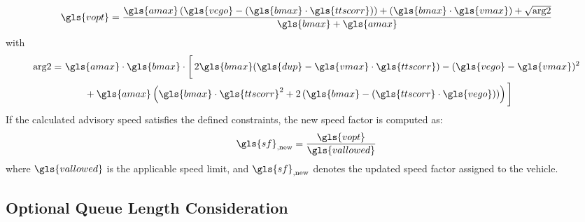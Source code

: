 \begin{equation}
    \gls{vopt} = \frac{\gls{amax} \left(\gls{vego} - (\gls{bmax} \cdot \gls{ttscorr})\right) + (\gls{bmax} \cdot \gls{vmax}) + \sqrt{\text{arg2}}}{\gls{bmax} + \gls{amax}}
\end{equation}
with
\begin{align}
    \text{arg2} =\ & \gls{amax} \cdot \gls{bmax} \cdot \bigg[\,2 \gls{bmax} (\gls{dup} - \gls{vmax} \cdot \gls{ttscorr}) - (\gls{vego} - \gls{vmax})^2 \notag \\
    & \qquad + \gls{amax} \left(\gls{bmax} \cdot \gls{ttscorr}^2 + 2 \left(\gls{bmax} - (\gls{ttscorr} \cdot \gls{vego})\right)\right) \bigg]
\end{align}
If the calculated advisory speed satisfies the defined constraints, the new speed factor is computed as:
\begin{equation}
    \gls{sf}_{\text{,new}} = \frac{\gls{vopt}}{\gls{vallowed}}
\end{equation}
where $\gls{vallowed}$ is the applicable speed limit, and $\gls{sf}_{\text{,new}}$ denotes the updated speed factor assigned to the vehicle.

\subsection{Optional Queue Length Consideration}
\label{sec:Glosa_Queue_Length}

